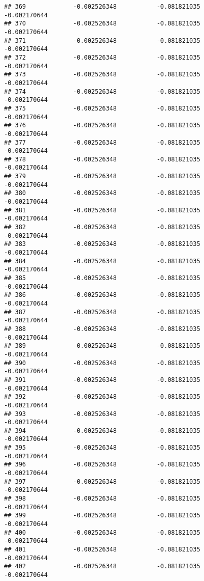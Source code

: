 \documentclass[]{article}
\begin{document}
\begin{verbatim}
## 369             -0.002526348           -0.081821035           -0.002170644
## 370             -0.002526348           -0.081821035           -0.002170644
## 371             -0.002526348           -0.081821035           -0.002170644
## 372             -0.002526348           -0.081821035           -0.002170644
## 373             -0.002526348           -0.081821035           -0.002170644
## 374             -0.002526348           -0.081821035           -0.002170644
## 375             -0.002526348           -0.081821035           -0.002170644
## 376             -0.002526348           -0.081821035           -0.002170644
## 377             -0.002526348           -0.081821035           -0.002170644
## 378             -0.002526348           -0.081821035           -0.002170644
## 379             -0.002526348           -0.081821035           -0.002170644
## 380             -0.002526348           -0.081821035           -0.002170644
## 381             -0.002526348           -0.081821035           -0.002170644
## 382             -0.002526348           -0.081821035           -0.002170644
## 383             -0.002526348           -0.081821035           -0.002170644
## 384             -0.002526348           -0.081821035           -0.002170644
## 385             -0.002526348           -0.081821035           -0.002170644
## 386             -0.002526348           -0.081821035           -0.002170644
## 387             -0.002526348           -0.081821035           -0.002170644
## 388             -0.002526348           -0.081821035           -0.002170644
## 389             -0.002526348           -0.081821035           -0.002170644
## 390             -0.002526348           -0.081821035           -0.002170644
## 391             -0.002526348           -0.081821035           -0.002170644
## 392             -0.002526348           -0.081821035           -0.002170644
## 393             -0.002526348           -0.081821035           -0.002170644
## 394             -0.002526348           -0.081821035           -0.002170644
## 395             -0.002526348           -0.081821035           -0.002170644
## 396             -0.002526348           -0.081821035           -0.002170644
## 397             -0.002526348           -0.081821035           -0.002170644
## 398             -0.002526348           -0.081821035           -0.002170644
## 399             -0.002526348           -0.081821035           -0.002170644
## 400             -0.002526348           -0.081821035           -0.002170644
## 401             -0.002526348           -0.081821035           -0.002170644
## 402             -0.002526348           -0.081821035           -0.002170644

\end{verbatim}
\end{document}
